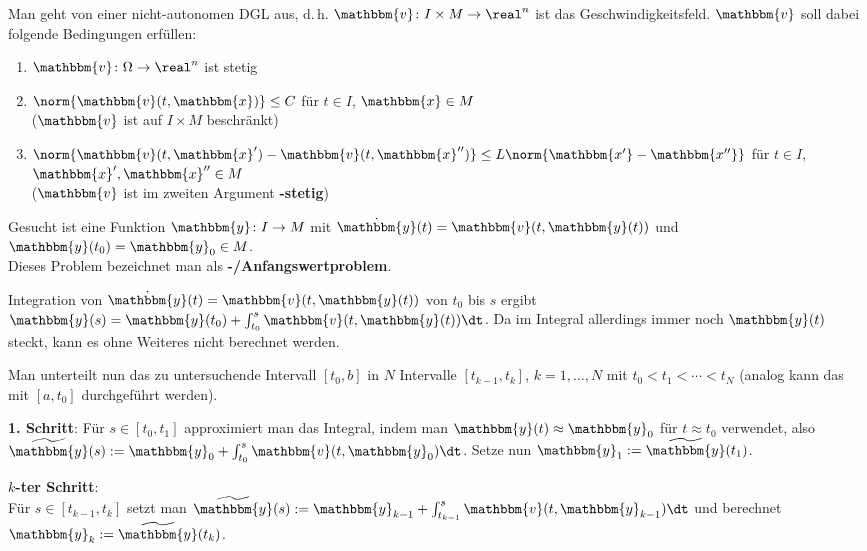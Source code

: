 Man geht von einer nicht-autonomen DGL aus, d.\,h.
$\mathbbm{v}\colon I \times M \rightarrow \real^n$
ist das Geschwindigkeitsfeld.
$\mathbbm{v}$ soll dabei folgende Bedingungen erfüllen:
\begin{enumerate}
    \item
    $\mathbbm{v}\colon \Omega \rightarrow \real^n$ ist stetig
    
    \item
    $\norm{\mathbbm{v}(t, \mathbbm{x})} \le C$ für
    $t \in I$, $\mathbbm{x} \in M$ \\
    ($\mathbbm{v}$ ist auf $I \times M$ beschränkt)
    
    \item
    $\norm{\mathbbm{v}(t, \mathbbm{x}') - \mathbbm{v}(t, \mathbbm{x}'')} \le
    L \norm{\mathbbm{x'} - \mathbbm{x''}}$ für
    $t \in I$, $\mathbbm{x}', \mathbbm{x}'' \in M$ \\
    ($\mathbbm{v}$ ist im zweiten Argument \textbf{-stetig})
\end{enumerate}
Gesucht ist eine Funktion $\mathbbm{y}\colon I \rightarrow M$
mit $\dot{\mathbbm{y}}(t) = \mathbbm{v}(t, \mathbbm{y}(t))$
und $\mathbbm{y}(t_0) = \mathbbm{y}_0 \in M$. \\
Dieses Problem bezeichnet man als \textbf{-/Anfangswertproblem}.

\linie
\pagebreak

Integration von $\dot{\mathbbm{y}}(t) = \mathbbm{v}(t, \mathbbm{y}(t))$
von $t_0$ bis $s$ ergibt
$\mathbbm{y}(s) = \mathbbm{y}(t_0) +
\int_{t_0}^s \mathbbm{v}(t, \mathbbm{y}(t))\dt$.
Da im Integral allerdings immer noch $\mathbbm{y}(t)$ steckt, kann es ohne
Weiteres nicht berechnet werden.

Man unterteilt nun das zu untersuchende Intervall $[t_0, b]$ in $N$ Intervalle
$[t_{k-1}, t_k]$, $k = 1, \dotsc, N$ mit $t_0 < t_1 < \dotsb < t_N$
(analog kann das mit $[a, t_0]$ durchgeführt werden).

\textbf{1. Schritt}:
Für $s \in [t_0, t_1]$ approximiert man das Integral, indem man
$\mathbbm{y}(t) \approx \mathbbm{y}_0$ für $t \approx t_0$ verwendet, also
$\widetilde{\mathbbm{y}}(s) := \mathbbm{y}_0 +
\int_{t_0}^s \mathbbm{v}(t, \mathbbm{y}_0)\dt$.
Setze nun $\mathbbm{y}_1 := \widetilde{\mathbbm{y}}(t_1)$.

\textbf{$k$-ter Schritt}: \\
Für $s \in [t_{k-1}, t_k]$ setzt man
$\widetilde{\mathbbm{y}}(s) := \mathbbm{y}_{k-1} +
\int_{t_{k-1}}^s \mathbbm{v}(t, \mathbbm{y}_{k-1})\dt$
und berechnet $\mathbbm{y}_k := \widetilde{\mathbbm{y}}(t_k)$.


